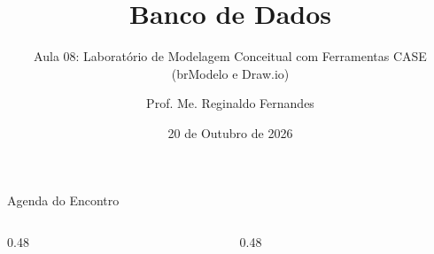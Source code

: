 \documentclass[aspectratio=169,utf8,t]{beamer}
\author{Prof. Me. Reginaldo Fernandes}
\institute{Instituto Federal do Ceará -- Campus Tauá \\ Tecnologia em Telemática}
\title{Banco de Dados}
\subtitle{Aula 08: Laboratório de Modelagem Conceitual com Ferramentas CASE (brModelo e Draw.io)}
\date{20 de Outubro de 2026}
\begin{document}
\frame[plain]{\titlepage}

\begin{frame}{Agenda do Encontro}
  \begin{columns}[t]
    \begin{column}{0.48\textwidth}
      \scriptsize
      \tableofcontents[sections={1-5}]
    \end{column}
    \begin{column}{0.48\textwidth}
      \scriptsize
      \tableofcontents[sections={6-9}]
    \end{column}
  \end{columns}
\end{frame}










\end{document}
